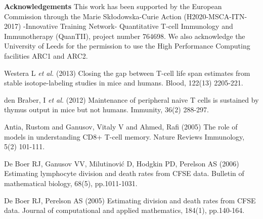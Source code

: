 \documentclass[10pt]{article}
\numberwithin{equation}{section}
\begin{document}
{\bf Acknowledgements}
This work has been supported by the European Commission through the Marie Skłodowska-Curie Action (H2020-MSCA-ITN-2017) -Innovative Training Network- Quantitative T-cell Immunology and Immunotherapy (QuanTII), project number 764698. We also acknowledge the University of Leeds for the permission to use the High Performance Computing facilities ARC1 and ARC2.


\begin{thebibliography}{}
%

Westera L {\em et al.}
(2013)
{Closing the gap between T-cell life span estimates from stable isotope-labeling studies in mice and humans}.
Blood, 122(13) {2205-221}.

den Braber, I  {\em et al.}
(2012)
{Maintenance of peripheral naive T cells is sustained by thymus output in mice but not humans}.
Immunity, 36(2) 288-297.

Antia, Rustom and Ganusov, Vitaly V and Ahmed, Rafi
(2005)
{The role of models in understanding CD8+ T-cell memory}.
{Nature Reviews Immunology},
5(2) 101-111.





De Boer RJ, Ganusov VV, Milutinović D, Hodgkin PD, Perelson AS (2006) Estimating lymphocyte division and death rates from CFSE data. Bulletin of mathematical biology, 68(5), pp.1011-1031.

De Boer RJ, Perelson AS (2005) Estimating division and death rates from CFSE data. Journal of computational and applied mathematics, 184(1), pp.140-164.


\end{thebibliography}
\end{document}
